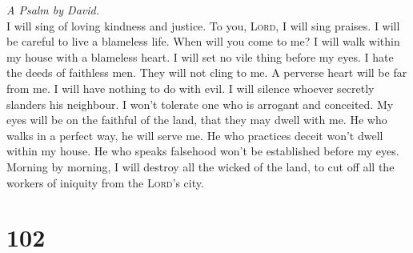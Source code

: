 \emph{A Psalm by David.}\\
 I will sing of loving kindness and justice. To you,
\textsc{Lord}, I will sing praises.  I will be careful to
live a blameless life. When will you come to me? I will walk within my
house with a blameless heart.  I will set no vile thing
before my eyes. I hate the deeds of faithless men. They will not cling
to me.  A perverse heart will be far from me. I will have
nothing to do with evil.  I will silence whoever secretly
slanders his neighbour. I won't tolerate one who is arrogant and
conceited.  My eyes will be on the faithful of the land,
that they may dwell with me. He who walks in a perfect way, he will
serve me.  He who practices deceit won't dwell within my
house. He who speaks falsehood won't be established before my eyes.
 Morning by morning, I will destroy all the wicked of the
land, to cut off all the workers of iniquity from the \textsc{Lord}'s
city.

\hypertarget{section-101}{%
\section{102}\label{section-101}}

